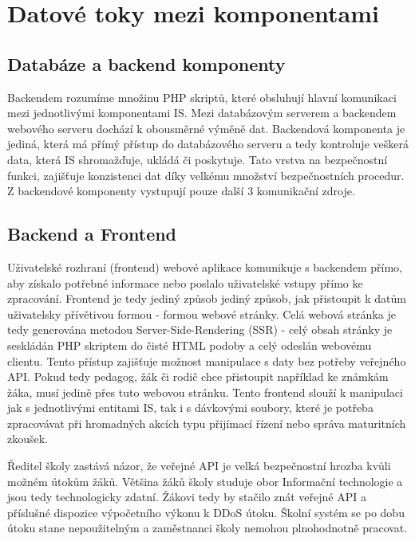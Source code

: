 \documentclass[FM,Proj]{tulthesis}
\begin{document}
\section{Datové toky mezi komponentami}
\label{section:datove-toky-mezi-komponentami}
\subsection*{Databáze a backend komponenty}
Backendem rozumíme množinu PHP skriptů, které obsluhují hlavní komunikaci mezi 
jednotlivými komponentami IS.
Mezi databázovým serverem a backendem webového serveru dochází k obousměrné výměně
dat. Backendová komponenta je jediná, která má přímý přístup do databázového serveru
a tedy kontroluje veškerá data, která IS shromažďuje, ukládá či poskytuje. Tato
vrstva na bezpečnostní funkci, zajišťuje konzistenci dat díky velkému množství
bezpečnostních procedur. Z backendové komponenty vystupují pouze další 3 komunikační
zdroje.

\subsection{Backend a Frontend}
\label{section:backend-a-frontend}
Uživatelské rozhraní (frontend) webové aplikace komunikuje s backendem přímo, aby získalo
potřebné informace nebo poslalo uživatelské vstupy přímo ke zpracování. Frontend je
tedy jediný způsob jediný způsob, jak přistoupit k datům uživatelsky přívětivou 
formou - formou webové stránky. Celá webová stránka je tedy generována metodou 
Server-Side-Rendering (SSR) - celý obsah stránky je seskládán
PHP skriptem do čisté HTML podoby a celý odeslán webovému clientu. Tento přístup zajišťuje
možnost manipulace s daty bez potřeby veřejného API. Pokud tedy pedagog, žák či 
rodič chce přistoupit například ke známkám žáka, musí jedině přes tuto webovou stránku.
Tento frontend slouží k manipulaci jak s jednotlivými entitami IS, tak i s dávkovými soubory,
které je potřeba zpracovávat při hromadných akcích typu přijímací řízení nebo správa 
maturitních zkoušek.

Ředitel školy zastává názor, že veřejné API je velká bezpečnostní hrozba kvůli možném útokům
žáků. Většina žáků školy studuje obor Informační technologie a jsou tedy technologicky zdatní.
Žákovi tedy by stačilo znát veřejné API a příslušné dispozice výpočetního výkonu k DDoS útoku.
Školní systém se po dobu útoku stane nepoužitelným a zaměstnanci školy nemohou plnohodnotně
pracovat.
\end{document}
